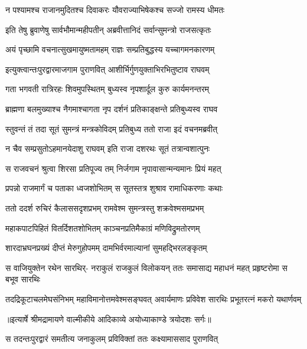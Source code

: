 \twolineshloka
{न पश्यामश्च राजानमुदितश्च दिवाकरः}
{यौवराज्याभिषेकश्च सज्जो रामस्य धीमतः} %

\twolineshloka
{इति तेषु ब्रुवाणेषु सार्वभौमान्महीपतीन्}
{अब्रवीत्तानिदं सर्वान्सुमन्त्रो राजसत्कृतः} %

\twolineshloka
{अयं पृच्छामि वचनात्सुखमायुष्मतामहम्}
{राज्ञः सम्प्रतिबुद्धस्य यच्चागमनकारणम्} %

\twolineshloka
{इत्युक्त्वान्तःपुरद्वारमाजगाम पुराणवित्}
{आशीर्भिर्गुणयुक्ताभिरभितुष्टाव राघवम्} %

\twolineshloka
{गता भगवती रात्रिरहः शिवमुपस्थितम्}
{बुध्यस्व नृपशार्दूल कुरु कार्यमनन्तरम्} %

\twolineshloka
{ब्राह्मणा बलमुख्याश्च नैगमाश्चागता नृप}
{दर्शनं प्रतिकाङ्क्षन्ते प्रतिबुध्यस्व राघव} %

\twolineshloka
{स्तुवन्तं तं तदा सूतं सुमन्त्रं मन्त्रकोविदम्}
{प्रतिबुध्य ततो राजा इदं वचनमब्रवीत्} %

\twolineshloka
{न चैव सम्प्रसुतोऽहमानयेदाशु राघवम्}
{इति राजा दशरथः सूतं तत्रान्वशात्पुनः} %

\twolineshloka
{स राजवचनं श्रुत्वा शिरसा प्रतिपूज्य तम्}
{निर्जगाम नृपावासान्मन्यमानः प्रियं महत्} %

\twolineshloka
{प्रपन्नो राजमार्गं च पताका ध्वजशोभितम्}
{स सूतस्तत्र शुश्राव रामाधिकरणाः कथाः} %

\twolineshloka
{ततो ददर्श रुचिरं कैलाससदृशप्रभम्}
{रामवेश्म सुमन्त्रस्तु शक्रवेश्मसमप्रभम्} %

\twolineshloka
{महाकपाटपिहितं वितर्दिशतशोभितम्}
{काञ्चनप्रतिमैकाग्रं मणिविद्रुमतोरणम्} %

\twolineshloka
{शारदाभ्रघनप्रख्यं दीप्तं मेरुगुहोपमम्}
{दामभिर्वरमाल्यानां सुमहद्भिरलङ्कृतम्} %

\fourlineindentedshloka
{स वाजियुक्तेन रथेन सारथिर्-}
{नराकुलं राजकुलं विलोकयन्}
{ततः समासाद्य महाधनं महत्}
{प्रहृष्टरोमा स बभूव सारथिः} %

\fourlineindentedshloka
{तदद्रिकूटाचलमेघसंनिभम्}
{महाविमानोत्तमवेश्मसङ्घवत्}
{अवार्यमाणः प्रविवेश सारथिः}
{प्रभूतरत्नं मकरो यथार्णवम्} %


{॥इत्यार्षे श्रीमद्रामायणे वाल्मीकीये आदिकाव्ये अयोध्याकाण्डे त्रयोदशः सर्गः॥}


\twolineshloka
{स तदन्तःपुरद्वारं समतीत्य जनाकुलम्}
{प्रविविक्तां ततः कक्ष्यामाससाद पुराणवित्} %

